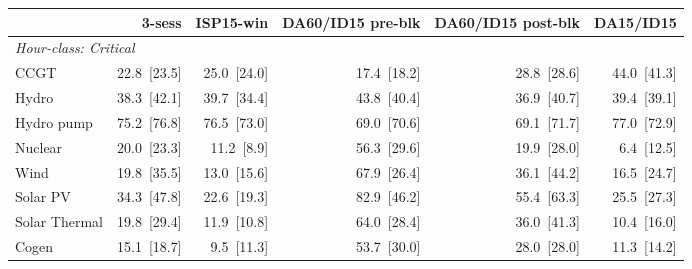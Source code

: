 \begin{tabular}{l r r r r r}
\toprule
 & 3-sess & ISP15-win & DA60/ID15 pre-blk & DA60/ID15 post-blk & DA15/ID15 \\
\midrule
\multicolumn{6}{l}{\textit{Hour-class: Critical}} \\
CCGT & 22.8~{\color{seasoncol}\scriptsize[23.5]} & 25.0~{\color{seasoncol}\scriptsize[24.0]} & 17.4~{\color{seasoncol}\scriptsize[18.2]} & 28.8~{\color{seasoncol}\scriptsize[28.6]} & 44.0~{\color{seasoncol}\scriptsize[41.3]} \\
Hydro & 38.3~{\color{seasoncol}\scriptsize[42.1]} & 39.7~{\color{seasoncol}\scriptsize[34.4]} & 43.8~{\color{seasoncol}\scriptsize[40.4]} & 36.9~{\color{seasoncol}\scriptsize[40.7]} & 39.4~{\color{seasoncol}\scriptsize[39.1]} \\
Hydro pump & 75.2~{\color{seasoncol}\scriptsize[76.8]} & 76.5~{\color{seasoncol}\scriptsize[73.0]} & 69.0~{\color{seasoncol}\scriptsize[70.6]} & 69.1~{\color{seasoncol}\scriptsize[71.7]} & 77.0~{\color{seasoncol}\scriptsize[72.9]} \\
Nuclear & 20.0~{\color{seasoncol}\scriptsize[23.3]} & 11.2~{\color{seasoncol}\scriptsize[8.9]} & 56.3~{\color{seasoncol}\scriptsize[29.6]} & 19.9~{\color{seasoncol}\scriptsize[28.0]} & 6.4~{\color{seasoncol}\scriptsize[12.5]} \\
Wind & 19.8~{\color{seasoncol}\scriptsize[35.5]} & 13.0~{\color{seasoncol}\scriptsize[15.6]} & 67.9~{\color{seasoncol}\scriptsize[26.4]} & 36.1~{\color{seasoncol}\scriptsize[44.2]} & 16.5~{\color{seasoncol}\scriptsize[24.7]} \\
Solar PV & 34.3~{\color{seasoncol}\scriptsize[47.8]} & 22.6~{\color{seasoncol}\scriptsize[19.3]} & 82.9~{\color{seasoncol}\scriptsize[46.2]} & 55.4~{\color{seasoncol}\scriptsize[63.3]} & 25.5~{\color{seasoncol}\scriptsize[27.3]} \\
Solar Thermal & 19.8~{\color{seasoncol}\scriptsize[29.4]} & 11.9~{\color{seasoncol}\scriptsize[10.8]} & 64.0~{\color{seasoncol}\scriptsize[28.4]} & 36.0~{\color{seasoncol}\scriptsize[41.3]} & 10.4~{\color{seasoncol}\scriptsize[16.0]} \\
Cogen & 15.1~{\color{seasoncol}\scriptsize[18.7]} & 9.5~{\color{seasoncol}\scriptsize[11.3]} & 53.7~{\color{seasoncol}\scriptsize[30.0]} & 28.0~{\color{seasoncol}\scriptsize[28.0]} & 11.3~{\color{seasoncol}\scriptsize[14.2]} \\

\end{tabular}
